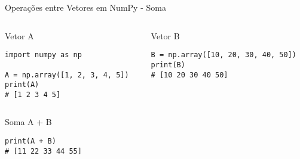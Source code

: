 \begin{frame}[fragile]{Operações entre Vetores em NumPy - Soma}

    \begin{columns}[T]
        \begin{column}{0.5\textwidth}
            \begin{block}{Vetor A}
                \begin{verbatim}
import numpy as np

A = np.array([1, 2, 3, 4, 5])
print(A)
# [1 2 3 4 5]
\end{verbatim}
            \end{block}
        \end{column}

        \begin{column}{0.5\textwidth}
            \begin{block}{Vetor B}
                \begin{verbatim}
B = np.array([10, 20, 30, 40, 50])
print(B)
# [10 20 30 40 50]
\end{verbatim}
            \end{block}
        \end{column}
    \end{columns}

    \vspace{0.3cm}
    \begin{exampleblock}{Soma A + B}
        \begin{verbatim}
print(A + B)
# [11 22 33 44 55]
\end{verbatim}
    \end{exampleblock}

\end{frame}

